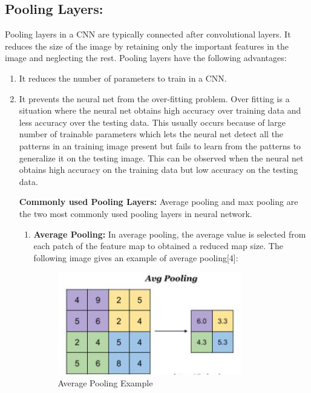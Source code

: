 \documentclass{IEEEtran}
\begin{document}
\subsection{\textbf{Pooling Layers:}}
Pooling layers in a CNN are typically connected after convolutional layers. It reduces the size of the image by retaining only the important features in the image and neglecting the rest. Pooling layers have the following advantages:
\begin{enumerate}
\item It reduces the number of parameters to train in a CNN.

\item It prevents the neural net from the over-fitting problem. Over fitting is a situation where the neural net obtains high accuracy over training data and less accuracy over the testing data. This usually occurs because of large number of trainable parameters which lets the neural net detect all the patterns in an training image present but fails to learn from the patterns to generalize it on the testing image. This can be observed when the neural net obtains high accuracy on the training data but low accuracy on the testing data.
\newline

\textbf{Commonly used Pooling Layers:} Average pooling and max pooling are the two most commonly used pooling layers in neural network.
\begin{enumerate}
\item \textbf{Average Pooling:} In average pooling, the average value is selected from each patch of the feature map to obtained a reduced map size. The following image gives an example of average pooling[4]:

\begin{figure}[h]
    \centering
    \captionsetup{justification=centering}
    \includegraphics[width=8cm]{avgpool}
    \caption{Average Pooling Example}
    \label{fig:Average Pooling Example}
\end{figure}


\end{enumerate}
\end{enumerate}
\end{document}
